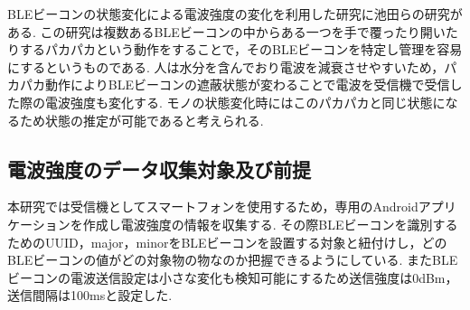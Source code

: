 \documentclass[Japanese]{dicomopapers}
\begin{document}
BLEビーコンの状態変化による電波強度の変化を利用した研究に池田ら\cite{BLEpkpk}の研究がある.
この研究は複数あるBLEビーコンの中からある一つを手で覆ったり開いたりするパカパカという動作をすることで，そのBLEビーコンを特定し管理を容易にするというものである.
人は水分を含んでおり電波を減衰させやすいため，パカパカ動作によりBLEビーコンの遮蔽状態が変わることで電波を受信機で受信した際の電波強度も変化する.
モノの状態変化時にはこのパカパカと同じ状態になるため状態の推定が可能であると考えられる.





\subsection{電波強度のデータ収集対象及び前提}

本研究では受信機としてスマートフォンを使用するため，専用のAndroidアプリケーションを作成し電波強度の情報を収集する.
その際BLEビーコンを識別するためのUUID，major，minorをBLEビーコンを設置する対象と紐付けし，どのBLEビーコンの値がどの対象物の物なのか把握できるようにしている.
またBLEビーコンの電波送信設定は小さな変化も検知可能にするため送信強度は0dBm，送信間隔は100msと設定した.





\end{document}
